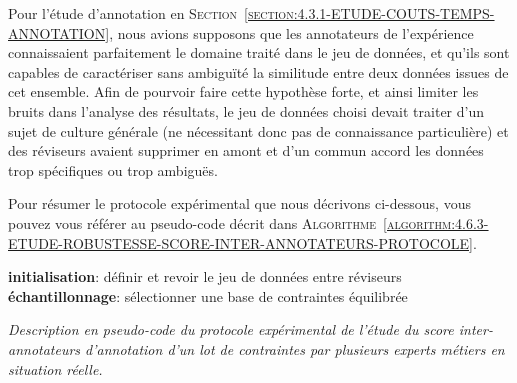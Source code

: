 			\begin{leftBarWarning}
				Pour l'étude d'annotation en \textsc{Section~\ref{section:4.3.1-ETUDE-COUTS-TEMPS-ANNOTATION}}, nous avions supposons que les annotateurs de l'expérience connaissaient parfaitement le domaine traité dans le jeu de données, et qu'ils sont capables de caractériser sans ambiguïté la similitude entre deux données issues de cet ensemble.
				Afin de pourvoir faire cette hypothèse forte, et ainsi limiter les bruits dans l'analyse des résultats, le jeu de données choisi devait traiter d'un sujet de culture générale (ne nécessitant donc pas de connaissance particulière) et des réviseurs avaient supprimer en amont et d'un commun accord les données trop spécifiques ou trop ambiguës.
			\end{leftBarWarning}
			
			Pour résumer le protocole expérimental que nous décrivons ci-dessous, vous pouvez vous référer au pseudo-code décrit dans \textsc{Algorithme~\ref{algorithm:4.6.3-ETUDE-ROBUSTESSE-SCORE-INTER-ANNOTATEURS-PROTOCOLE}}.

			\begin{algorithm}
				\textbf{initialisation}: définir et revoir le jeu de données entre réviseurs \;
				\textbf{échantillonnage}: sélectionner une base de contraintes équilibrée \;
				\caption{\textit{
					Description en pseudo-code du protocole expérimental de l'étude du score inter-annotateurs d'annotation d'un lot de contraintes par plusieurs experts métiers en situation réelle.
				}}
				\label{algorithm:4.6.3-ETUDE-ROBUSTESSE-SCORE-INTER-ANNOTATEURS-PROTOCOLE}
			\end{algorithm}
			
